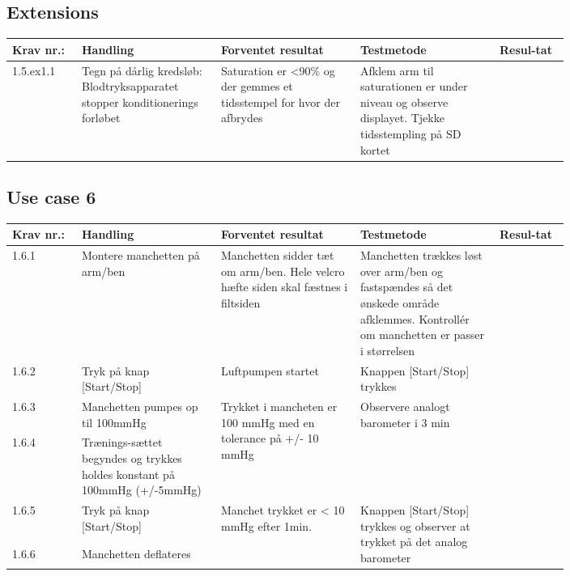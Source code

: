 				\subsection*{Extensions}
					\begin{longtable}{|p{0.1\linewidth}|p{0.2\linewidth}|p{0.2\linewidth}|p{0.2\linewidth}|p{0.1\linewidth}|}
							\hline
							Krav nr.: & Handling & Forventet resultat & Testmetode & Resul-tat  \\\hline
							1.5.ex1.1 & Tegn på dårlig kredsløb: Blodtryksapparatet stopper konditionerings forløbet & Saturation er \textless90\% og der gemmes et tidsstempel for hvor der afbrydes & Afklem arm til saturationen er  under niveau og observe displayet.
							Tjekke tidsstempling på SD kortet & \\ \hline
					\end{longtable}
				
				\pagebreak
					\subsection{Use case 6}
						\begin{longtable}{|p{0.1\linewidth}|p{0.2\linewidth}|p{0.2\linewidth}|p{0.2\linewidth}|p{0.1\linewidth}|}
								\hline
								Krav nr.: & Handling & Forventet resultat & Testmetode & Resul-tat  \\\hline
								1.6.1 & Montere manchetten på arm/ben & Manchetten sidder tæt om arm/ben. Hele velcro hæfte siden skal fæstnes i filtsiden & Manchetten trækkes løst over arm/ben og fastspændes så det ønskede område afklemmes. Kontrollér om manchetten er passer i størrelsen & \\ \hline
								1.6.2 & Tryk på knap [Start/Stop] & Luftpumpen startet & Knappen [Start/Stop] trykkes & \\ \hline
								1.6.3 & Manchetten pumpes op til 100mmHg & \multirow{2}{\linewidth}{Trykket i mancheten er 100 mmHg med en tolerance på +/- 10 mmHg}& \multirow{2}{\linewidth}{Observere analogt barometer i 3 min}& \multirow{2}{\linewidth}{} \\ \cline{1-2}
								1.6.4 & Trænings-sættet begyndes og trykkes holdes konstant på 100mmHg (+/-5mmHg) & & & \\ \hline
								1.6.5 & Tryk på knap [Start/Stop]  & \multirow{2}{\linewidth}{Manchet trykket er < 10 mmHg efter 1min.} & \multirow{2}{\linewidth}{Knappen [Start/Stop] trykkes og observer at trykket på det analog barometer} & \multirow{2}{\linewidth}{} \\ [2cm] \cline{1-2}
								1.6.6 & Manchetten deflateres  & & & \\ \hline
						\end{longtable}
						
